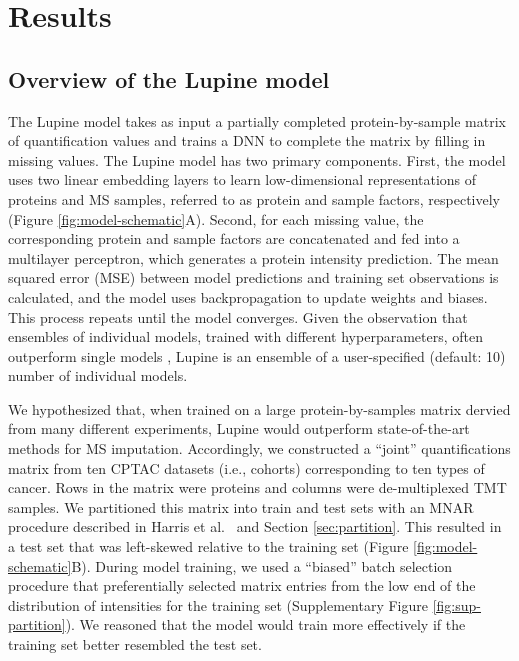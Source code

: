 \documentclass{article}
\newcommand{\fixme}[1]{{\color{red}{#1}}}
\begin{document}
\section{Results}

\subsection{Overview of the Lupine model}


The Lupine model takes as input a partially completed protein-by-sample matrix of quantification values and trains a DNN to complete the matrix by filling in missing values. The Lupine model has two primary components. First, the model uses two linear embedding layers to learn low-dimensional representations of proteins and MS samples, referred to as protein and sample factors, respectively (Figure \ref{fig:model-schematic}A). Second, for each missing value, the corresponding protein and sample factors are concatenated and fed into a multilayer perceptron, which generates a protein intensity prediction. The mean squared error (MSE) between model predictions and training set observations is calculated, and the model uses backpropagation to update weights and biases. This process repeats until the model converges. Given the observation that ensembles of individual models, trained with different hyperparameters, often outperform single models \cite{goodfellow-2016}, Lupine is an ensemble of a user-specified (default: 10) number of individual models. 

We hypothesized that, when trained on a large protein-by-samples matrix dervied from many different experiments, Lupine would outperform state-of-the-art methods for MS imputation. Accordingly, we constructed a ``joint'' quantifications matrix from ten CPTAC datasets (i.e., cohorts) corresponding to ten types of cancer. Rows in the matrix were proteins and columns were de-multiplexed TMT samples. We partitioned this matrix into train and test sets with an MNAR procedure described in Harris et al.\ \cite{ms-impute-bench} and Section \ref{sec:partition}. This resulted in a test set that was left-skewed relative to the training set (Figure \ref{fig:model-schematic}B). During model training, we used a ``biased'' batch selection procedure that preferentially selected matrix entries from the low end of the distribution of intensities for the training set (Supplementary Figure \ref{fig:sup-partition}). We reasoned that the model would train more effectively if the training set better resembled the test set.
\end{document}

